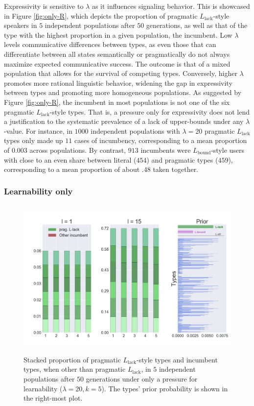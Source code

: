 \documentclass[a4paper]{article}
\newcommand{\mylang}[1]{\ensuremath{L_{\text{#1}}}\xspace} %
\newcommand{\Lbound}{\mylang{bound}}
\newcommand{\Llack}{\mylang{lack}}
\begin{document}
Expressivity is sensitive to $\lambda$ as it influences signaling behavior. This is showcased in Figure \ref{fig:only-R}, which depicts the proportion of pragmatic $\Llack$-style speakers in $5$ independent populations after $50$ generations, as well as that of the type with the highest proportion in a given population, the incumbent. Low $\lambda$ levels communicative differences between types, as even those that can differentiate between all states semantically or pragmatically do not always maximize expected communicative success. The outcome is that of a mixed population that allows for the survival of competing types. Conversely, higher $\lambda$ promotes more rational linguistic behavior, widening the gap in expressivity between types and promoting more homogeneous populations. As suggested by Figure \ref{fig:only-R}, the incumbent in most populations is not one of the six pragmatic $\Llack$-style types. That is, a pressure only for expressivity does not lend a justification to the systematic prevalence of a lack of upper-bounds under any $\lambda$-value. For instance, in $1000$ independent populations with $\lambda = 20$ pragmatic $\Llack$ types only made up $11$ cases of incumbency, corresponding to a mean proportion of $0.003$ across populations. By contrast, $913$ incumbents were $\Lbound$-style users with close to an even share between literal ($454$) and pragmatic types ($459$), corresponding to a mean proportion of about $.48$ taken together. %


\subsubsection{Learnability only}

\begin{figure}
\centering
\includegraphics[width=1\textwidth,height=8cm,keepaspectratio]{./plots/fig2-onlym-pr}
\caption{Stacked proportion of pragmatic $\Llack$-style types and incumbent types, when other than pragmatic $\Llack$, in $5$ independent populations after $50$ generations under only a pressure for learnability ($\lambda = 20, k = 5$). The types' prior probability is shown in the right-most plot.}
\label{fig:only-M}
\end{figure}
\end{document}

